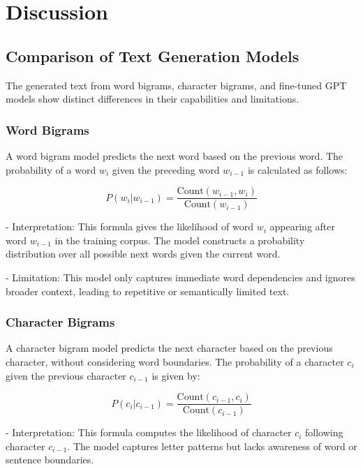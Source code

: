 \documentclass[journal,onecolumn]{IEEEtran}
\begin{document}

\section{Discussion}
\subsection{Comparison of Text Generation Models}

The generated text from word bigrams, character bigrams, and fine-tuned GPT models show distinct differences in their capabilities and limitations. 

\subsubsection{Word Bigrams}
A word bigram model predicts the next word based on the previous word. The probability of a word \( w_{i} \) given the preceding word \( w_{i-1} \) is calculated as follows:

\[
P(w_{i} | w_{i-1}) = \frac{\text{Count}(w_{i-1}, w_{i})}{\text{Count}(w_{i-1})}
\]

- Interpretation: This formula gives the likelihood of word \( w_{i} \) appearing after word \( w_{i-1} \) in the training corpus. The model constructs a probability distribution over all possible next words given the current word.

- Limitation: This model only captures immediate word dependencies and ignores broader context, leading to repetitive or semantically limited text.

\subsubsection{Character Bigrams}
A character bigram model predicts the next character based on the previous character, without considering word boundaries. The probability of a character \( c_{i} \) given the previous character \( c_{i-1} \) is given by:

\[
P(c_{i} | c_{i-1}) = \frac{\text{Count}(c_{i-1}, c_{i})}{\text{Count}(c_{i-1})}
\]

- Interpretation: This formula computes the likelihood of character \( c_{i} \) following character \( c_{i-1} \). The model captures letter patterns but lacks awareness of word or sentence boundaries.
\end{document}
